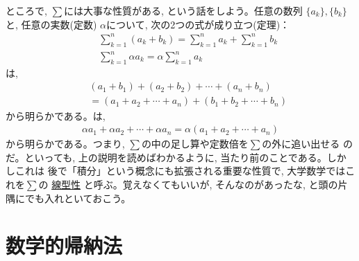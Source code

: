 ところで, $\sum$には大事な性質がある, という話をしよう。任意の数列
$\{a_k\}, \{b_k\}$と, 任意の実数(定数) $\alpha$について, 
次の2つの式が成り立つ(定理)：
\begin{eqnarray}
&&\sum_{k=1}^n (a_k+b_k) = \sum_{k=1}^n a_k + \sum_{k=1}^n b_k \label{eq:sum_linear1}\\
&&\sum_{k=1}^n \alpha a_k = \alpha \sum_{k=1}^n a_k \label{eq:sum_linear2}
\end{eqnarray}
は, 
\begin{eqnarray*}
&&(a_1+b_1)+(a_2+b_2)+\cdots+(a_n+b_n)\\
&&=(a_1+a_2+\cdots+a_n)+(b_1+b_2+\cdots+b_n)
\end{eqnarray*}
から明らかである。は, 
\begin{eqnarray*}
\alpha a_1+\alpha a_2+\cdots+\alpha a_n=\alpha(a_1+a_2+\cdots+a_n)
\end{eqnarray*}
から明らかである。つまり, $\sum$の中の足し算や定数倍を$\sum$の外に追い出せる
のだ。といっても, 上の説明を読めばわかるように, 当たり前のことである。しかしこれは
後で「積分」という概念にも拡張される重要な性質で, 大学数学ではこれを$\sum$の
\underline{線型性}
と呼ぶ。覚えなくてもいいが, そんなのがあったな, と頭の片隅にでも入れといておこう。\\





\section{数学的帰納法}

